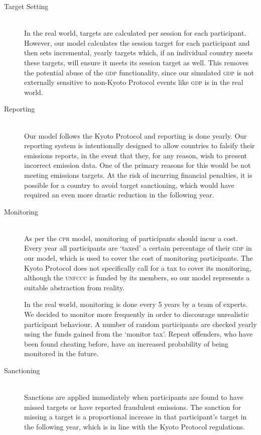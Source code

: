 \begin{description}
\item [Target Setting] \hfill \\ 
In the real world, targets are calculated per session for each participant. However, our model calculates the session target for each participant and then sets incremental, yearly targets which, if an individual country meets these targets, will ensure it meets its session target as well. This removes the potential abuse of the \textsc{gdp} functionality, since our simulated \textsc{gdp} is not externally sensitive to non-Kyoto Protocol events like \textsc{gdp} is in the real world.

\item [Reporting] \hfill \\ 
Our model follows the Kyoto Protocol and reporting is done yearly. Our reporting system is intentionally designed to allow countries to falsify their emissions reports, in the event that they, for any reason, wish to present incorrect emission data. One of the primary reasons for this would be not meeting emissions targets. At the risk of incurring financial penalties, it is possible for a country to avoid target sanctioning, which would have required an even more drastic reduction in the following year.

\item [Monitoring] \hfill \\ 
As per the \textsc{cpr} model, monitoring of participants should incur a cost. Every year all participants are `taxed' a certain percentage of their \textsc{gdp} in our model, which is used to cover the cost of monitoring participants. The Kyoto Protocol does not specifically call for a tax to cover its monitoring, although the \textsc{unfccc} is funded by its members, so our model represents a suitable abstraction from reality.

In the real world, monitoring is done every 5 years by a team of experts. We decided to monitor more frequently in order to discourage unrealistic participant behaviour. A number of random participants are checked yearly using the funds gained from the `monitor tax'. Repeat offenders, who have been found cheating before, have an increased probability of being monitored in the future.

\item [Sanctioning] \hfill \\ 
Sanctions are applied immediately when participants are found to have missed targets or have reported fraudulent emissions. The sanction for missing a target is a proportional increase in that participant's target in the following year, which is in line with the Kyoto Protocol regulations.


\end{description}
